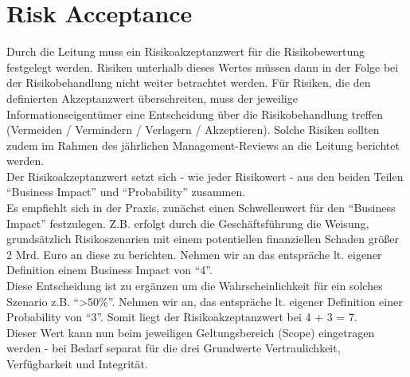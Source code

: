 \documentclass[a4paper,10pt]{book}
\begin{document}
\section{Risk Acceptance}
Durch die Leitung muss ein Risikoakzeptanzwert für die Risikobewertung festgelegt werden. Risiken unterhalb dieses Wertes müssen dann in
der Folge bei der Risikobehandlung nicht weiter betrachtet werden. Für Risiken, die den definierten Akzeptanzwert überschreiten, muss
der jeweilige Informationseigentümer eine Entscheidung über die Risikobehandlung treffen (Vermeiden / Vermindern / Verlagern / Akzeptieren).
Solche Risiken sollten zudem im Rahmen des jährlichen Management-Reviews an die Leitung berichtet werden.
\newline\\
Der Risikoakzeptanzwert setzt sich - wie jeder Risikowert - aus den beiden Teilen ``Business Impact'' und ``Probability'' zusammen.
\newline\\
Es empfiehlt sich in der Praxis, zunächst einen Schwellenwert für den ``Business Impact'' festzulegen. Z.B. erfolgt durch die
Geschäftsführung die Weisung, grundsätzlich Risikoszenarien mit einem potentiellen finanziellen Schaden größer 2 Mrd. Euro an diese zu
berichten. Nehmen wir an das entspräche lt. eigener Definition einem Business Impact von ``4''.
\newline\\
Diese Entscheidung ist zu ergänzen um die Wahrscheinlichkeit für ein solches Szenario z.B. ``\textgreater50\%''. Nehmen wir an, das
entspräche lt. eigener Definition einer Probability von ``3''. Somit liegt der Risikoakzeptanzwert bei 4 + 3 = 7.
\newline\\
Dieser Wert kann nun beim jeweiligen Geltungsbereich (Scope) eingetragen werden - bei Bedarf separat für die drei Grundwerte Vertraulichkeit,
Verfügbarkeit und Integrität.
\end{document}
